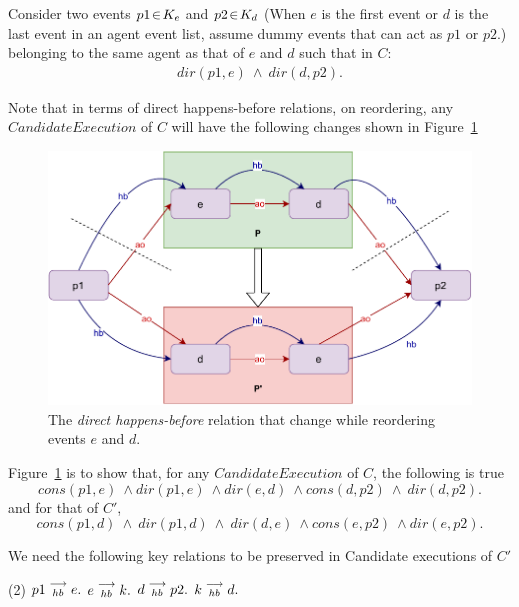 
    Consider two events $p1\!\in\!K_e$ and $p2\!\in\!K_d$ (When $e$ is the first event or $d$ is the last event in an agent event list, assume dummy events that can act as $p1$ or $p2$.) belonging to the same agent as that of $e$ and $d$ such that in $C$:
    \begin{align*}
        dir(p1,e)\ \wedge\ dir(d,p2).
    \end{align*}
    
    Note that in terms of direct happens-before relations, on reordering, any $Candidate Execution$ of $C$ will have the following changes shown in Figure~\ref{reord:preserve_hb(b)}
    \begin{figure}[H]
        \centering
        \includegraphics[scale=0.7]{4.InstructionReordering/4.ValidReorderingCandidate/ProofParts/Part1/part1(b).pdf}
        \caption{The \textit{direct happens-before} relation that change while reordering events $e$ and $d$.}
        \label{reord:preserve_hb(b)}
    \end{figure}
    
    Figure~\ref{reord:preserve_hb(b)} is to show that, for any $Candidate Execution$ of $C$, the following is true
    \[
        cons(p1,e) \ \wedge dir(p1,e) \ \wedge dir(e,d) \ \wedge cons(d,p2) \ \wedge \ dir(d,p2).
    \]
    and for that of $C'$,
    \[
        cons(p1,d) \ \wedge \ dir(p1,d) \ \wedge \ dir(d,e) \ \wedge cons(e,p2) \ \wedge dir(e,p2).
    \]
    
    We need the following key relations to be preserved in Candidate executions of $C'$ 
    \begin{tasks}[style=enumerate](2)
        \task $p1\stackrel{\longrightarrow}{_{hb}}e.$
        \task $e\stackrel{\longrightarrow}{_{hb}}k.$
        \task $d\stackrel{\longrightarrow}{_{hb}}p2.$
        \task $k\stackrel{\longrightarrow}{_{hb}}d.$ 
    \end{tasks}

